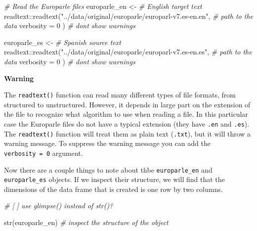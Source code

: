 \documentclass[
  letterpaper,
  DIV=11,
  numbers=noendperiod]{scrreport}
\newenvironment{Shaded}{\begin{snugshade}}{\end{snugshade}}
\newcommand{\AttributeTok}[1]{\textcolor[rgb]{0.00,0.00,0.00}{#1}}
\newcommand{\CommentTok}[1]{\textcolor[rgb]{0.00,0.00,0.00}{\textit{#1}}}
\newcommand{\DecValTok}[1]{\textcolor[rgb]{0.00,0.00,0.00}{#1}}
\newcommand{\FunctionTok}[1]{\textcolor[rgb]{0.00,0.00,0.00}{#1}}
\newcommand{\NormalTok}[1]{\textcolor[rgb]{0.00,0.00,0.00}{#1}}
\newcommand{\OtherTok}[1]{\textcolor[rgb]{0.00,0.00,0.00}{#1}}
\newcommand{\SpecialCharTok}[1]{\textcolor[rgb]{0.00,0.00,0.00}{#1}}
\newcommand{\StringTok}[1]{\textcolor[rgb]{0.00,0.00,0.00}{#1}}
\theoremstyle{definition}
\theoremstyle{remark}
\begin{document}
\begin{Shaded}
\begin{Highlighting}[]
\CommentTok{\# Read the Europarle files}
\NormalTok{europarle\_en }\OtherTok{\textless{}{-}} \CommentTok{\# English target text}
\NormalTok{  readtext}\SpecialCharTok{::}\FunctionTok{readtext}\NormalTok{(}\StringTok{"../data/original/europarle/europarl{-}v7.es{-}en.en"}\NormalTok{, }\CommentTok{\# path to the data}
    \AttributeTok{verbosity =} \DecValTok{0}
\NormalTok{  ) }\CommentTok{\# don\textquotesingle{}t show warnings}

\NormalTok{europarle\_es }\OtherTok{\textless{}{-}} \CommentTok{\# Spanish source text}
\NormalTok{  readtext}\SpecialCharTok{::}\FunctionTok{readtext}\NormalTok{(}\StringTok{"../data/original/europarle/europarl{-}v7.es{-}en.es"}\NormalTok{, }\CommentTok{\# path to the data}
    \AttributeTok{verbosity =} \DecValTok{0}
\NormalTok{  ) }\CommentTok{\# don\textquotesingle{}t show warnings}
\end{Highlighting}
\end{Shaded}

\begin{tcolorbox}[enhanced jigsaw, breakable, arc=.35mm, leftrule=.75mm, rightrule=.15mm, colback=white, toprule=.15mm, bottomrule=.15mm, opacityback=0, left=2mm]

\textbf{ Warning}

The \texttt{readtext()} function can read many different types of file
formats, from structured to unstructured. However, it depends in large
part on the extension of the file to recognize what algorithm to use
when reading a file. In this particular case the Europarle files do not
have a typical extension (they have \texttt{.en} and \texttt{.es}). The
\texttt{readtext()} function will treat them as plain text
(\texttt{.txt}), but it will throw a warning message. To suppress the
warning message you can add the \texttt{verbosity\ =\ 0} argument.

\end{tcolorbox}

Now there are a couple things to note about thbe \texttt{europarle\_en}
and \texttt{europarle\_es} objects. If we inspect their structure, we
will find that the dimensions of the data frame that is created is one
row by two columns.

\begin{Shaded}
\begin{Highlighting}[]
\CommentTok{\# [ ] use \textasciigrave{}glimpse()\textasciigrave{} instead of \textasciigrave{}str()\textasciigrave{}?}

\FunctionTok{str}\NormalTok{(europarle\_en) }\CommentTok{\# inspect the structure of the object}
\end{Highlighting}
\end{Shaded}
\end{document}
